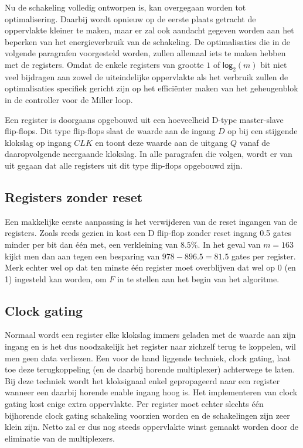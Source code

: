 Nu de schakeling volledig ontworpen is, kan overgegaan worden tot optimalisering. Daarbij wordt opnieuw op de eerste plaats getracht de oppervlakte kleiner te maken, maar er zal ook aandacht gegeven worden aan het beperken van het energieverbruik van de schakeling. De optimalisaties die in de volgende paragrafen voorgesteld worden, zullen allemaal iets te maken hebben met de registers. Omdat de enkele registers van grootte $1$ of $\textsf{log}_2(m)$ bit niet veel bijdragen aan zowel de uiteindelijke oppervlakte als het verbruik zullen de optimalisaties specifiek gericht zijn op het effici\"enter maken van het geheugenblok in de controller voor de Miller loop.

Een register is doorgaans opgebouwd uit een hoeveelheid D-type master-slave flip-flops. Dit type flip-flops slaat de waarde aan de ingang $D$ op bij een stijgende klokslag op ingang $CLK$ en toont deze waarde aan de uitgang $Q$ vanaf de daaropvolgende neergaande klokslag. In alle paragrafen die volgen, wordt er van uit gegaan dat alle registers uit dit type flip-flops opgebouwd zijn.

\subsection{Registers zonder reset}

Een makkelijke eerste aanpassing is het verwijderen van de reset ingangen van de registers. Zoals reeds gezien in  kost een D flip-flop zonder reset ingang 0.5 gates minder per bit dan \'e\'en met, een verkleining van $8.5\%$. In het geval van $m = 163$ kijkt men dan aan tegen een besparing van $978 - 896.5 = 81.5$ gates per register. Merk echter wel op dat ten minste \'e\'en register moet overblijven dat wel op 0 (en 1) ingesteld kan worden, om $F$ in te stellen aan het begin van het algoritme.

\subsection{Clock gating}


Normaal wordt een register elke klokslag immers geladen met de waarde aan zijn ingang en is het dus noodzakelijk het register naar zichzelf terug te koppelen, wil men geen data verliezen. Een voor de hand liggende techniek, clock gating, laat toe deze terugkoppeling (en de daarbij horende multiplexer) achterwege te laten. Bij deze techniek wordt het kloksignaal enkel gepropageerd naar een register wanneer een daarbij horende enable ingang hoog is. Het implementeren van clock gating kost enige extra oppervlakte. Per register moet echter slechts \'e\'en bijhorende clock gating schakeling voorzien  worden en de schakelingen zijn zeer klein zijn. Netto zal er dus nog steeds oppervlakte winst gemaakt worden door de eliminatie van de multiplexers.

